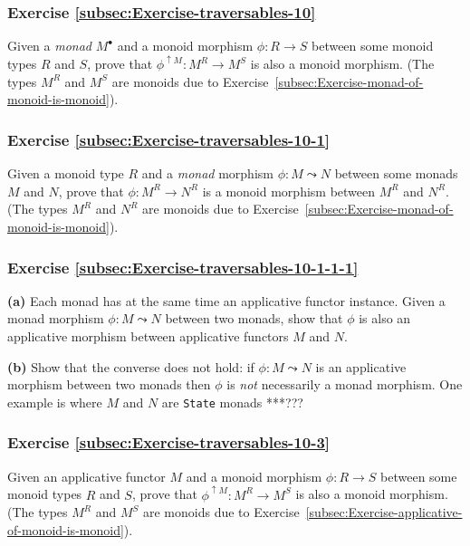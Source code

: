 \subsubsection{Exercise \label{subsec:Exercise-traversables-10}\ref{subsec:Exercise-traversables-10}}

Given a \emph{monad} $M^{\bullet}$ and a monoid morphism $\phi:R\rightarrow S$
between some monoid types $R$ and $S$, prove that $\phi^{\uparrow M}:M^{R}\rightarrow M^{S}$
is also a monoid morphism. (The types $M^{R}$ and $M^{S}$ are monoids
due to Exercise~\ref{subsec:Exercise-monad-of-monoid-is-monoid}).

\subsubsection{Exercise \label{subsec:Exercise-traversables-10-1}\ref{subsec:Exercise-traversables-10-1}}

Given a monoid type $R$ and a \emph{monad} morphism $\phi:M\leadsto N$
between some monads $M$ and $N$, prove that $\phi:M^{R}\rightarrow N^{R}$
is a monoid morphism between $M^{R}$ and $N^{R}$. (The types $M^{R}$
and $N^{R}$ are monoids due to Exercise~\ref{subsec:Exercise-monad-of-monoid-is-monoid}).

\subsubsection{Exercise \label{subsec:Exercise-traversables-10-1-1-1}\ref{subsec:Exercise-traversables-10-1-1-1}}

\textbf{(a)} Each monad has at the same time an applicative functor
instance. Given a monad morphism $\phi:M\leadsto N$ between two monads,
show that $\phi$ is also an applicative morphism between applicative
functors $M$ and $N$.

\textbf{(b)} Show that the converse does not hold: if $\phi:M\leadsto N$
is an applicative morphism between two monads then $\phi$ is \emph{not}
necessarily a monad morphism. One example is where $M$ and $N$ are
\lstinline!State! monads {*}{*}{*}???

\subsubsection{Exercise \label{subsec:Exercise-traversables-10-3}\ref{subsec:Exercise-traversables-10-3}}

Given an applicative functor $M$ and a monoid morphism $\phi:R\rightarrow S$
between some monoid types $R$ and $S$, prove that $\phi^{\uparrow M}:M^{R}\rightarrow M^{S}$
is also a monoid morphism. (The types $M^{R}$ and $M^{S}$ are monoids
due to Exercise~\ref{subsec:Exercise-applicative-of-monoid-is-monoid}).

